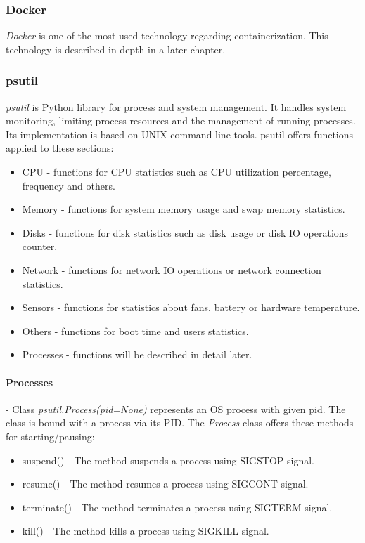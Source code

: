 \documentclass[12pt,a4paper]{article}
\begin{document}
\subsubsection{Docker}
\textit{Docker} is one of the most used technology regarding containerization. This technology is described in depth in a later chapter.

\subsubsection{psutil}
\textit{psutil} is Python library for process and system management. It handles system monitoring, limiting process resources
and the management of running processes. Its implementation is based on UNIX command line tools. psutil offers functions applied
to these sections:
\begin{itemize}
\item CPU - functions for CPU statistics such as CPU utilization percentage, frequency and others. 
\item Memory - functions for system memory usage and swap memory statistics.
\item Disks - functions for disk statistics such as disk usage or disk IO operations counter.
\item Network - functions for network IO operations or network connection statistics.
\item Sensors - functions for statistics about fans, battery or hardware temperature.
\item Others - functions for boot time and users statistics.
\item Processes - functions will be described in detail later.
\end{itemize}

\paragraph{Processes} - Class \textit{psutil.Process(pid=None)} represents an OS process with given pid. The class is
bound with a process via its PID. The \textit{Process} class offers these methods for starting/pausing:
\begin{itemize}
\item suspend() - The method suspends a process using SIGSTOP signal.
\item resume() - The method resumes a process using SIGCONT signal.
\item terminate() - The method terminates a process using SIGTERM signal.
\item kill() - The method kills a process using SIGKILL signal.
\end{itemize}
\end{document}

